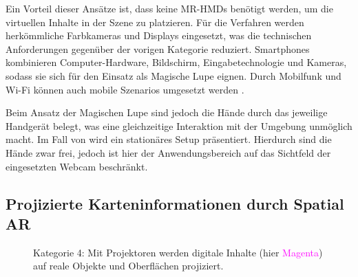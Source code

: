 Ein Vorteil dieser Ansätze ist, dass keine MR-HMDs benötigt werden, um die virtuellen Inhalte in der Szene zu platzieren.
Für die Verfahren werden herkömmliche Farbkameras und Displays eingesetzt, was die technischen Anforderungen gegenüber der vorigen Kategorie reduziert.
Smartphones kombinieren Computer-Hardware, Bildschirm, Eingabetechnologie und Kameras, sodass sie sich für den Einsatz als Magische Lupe eignen.
Durch Mobilfunk und Wi-Fi können auch mobile Szenarios umgesetzt werden \parencite[5]{Bimber2006}.

Beim Ansatz der Magischen Lupe sind jedoch die Hände durch das jeweilige Handgerät belegt, was eine gleichzeitige Interaktion mit der Umgebung unmöglich macht.
Im Fall von \textcite{Moore2005} wird ein stationäres Setup präsentiert.
Hierdurch sind die Hände zwar frei, jedoch ist hier der Anwendungsbereich auf das Sichtfeld der eingesetzten Webcam beschränkt.

\subsection{Projizierte Karteninformationen durch Spatial AR}
\begin{figure}[h]
    \centering
    \caption{Kategorie 4: Mit Projektoren werden digitale Inhalte (hier \textcolor{magenta}{Magenta}) auf reale Objekte und Oberflächen projiziert.}
    \label{fig:sketch_ar_projected}
\end{figure}

